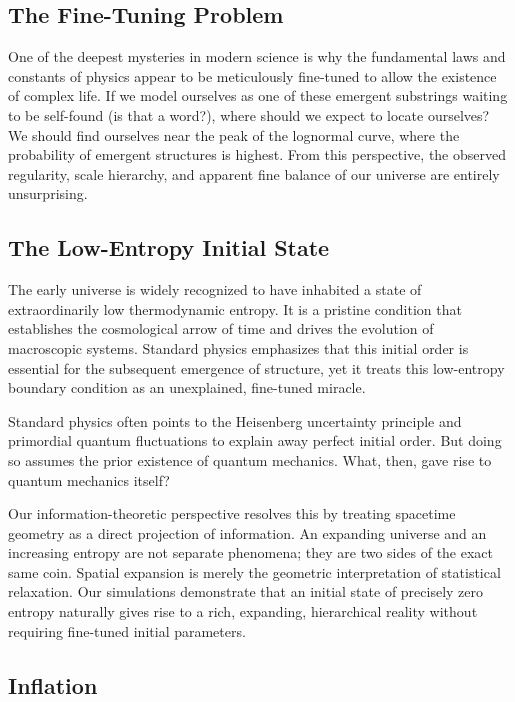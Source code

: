 \subsection*{The Fine-Tuning Problem}

One of the deepest mysteries in modern science is why the fundamental laws and constants of physics appear to be meticulously fine-tuned to allow the existence of complex life.
If we model ourselves as one of these emergent substrings waiting to be self-found (is that a word?), where should we expect to locate ourselves? 
We should find ourselves near the peak of the lognormal curve, where the probability of emergent structures is highest. 
From this perspective, the observed regularity, scale hierarchy, and apparent fine balance of our universe are entirely unsurprising. 



\subsection*{The Low-Entropy Initial State}

The early universe is widely recognized to have inhabited a state of extraordinarily low thermodynamic entropy. It is a pristine condition that establishes the cosmological arrow of time 
and drives the evolution of macroscopic systems. Standard physics emphasizes that this initial order is essential for the subsequent emergence of structure, 
yet it treats this low-entropy boundary condition as an unexplained, fine-tuned miracle. 

Standard physics often points to the Heisenberg uncertainty principle and primordial quantum fluctuations to explain away perfect initial order. 
But doing so assumes the prior existence of quantum mechanics. What, then, gave rise to quantum mechanics itself?

Our information-theoretic perspective resolves this by treating spacetime geometry as a direct projection of information. An expanding universe and an increasing entropy 
are not separate phenomena; they are two sides of the exact same coin. Spatial expansion is merely the geometric interpretation of statistical relaxation. 
Our simulations demonstrate that an initial state of precisely zero entropy naturally gives rise to a rich, expanding, hierarchical reality without requiring fine-tuned initial parameters.


\subsection*{Inflation}

